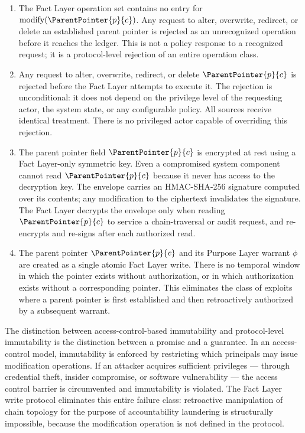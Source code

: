 \begin{enumerate}
    \item[(W1) \textbf{No modification operation defined.}] The Fact Layer operation set contains no entry for $\mathrm{modify}(\ParentPointer{p}{c})$. Any request to alter, overwrite, redirect, or delete an established parent pointer is rejected as an unrecognized operation before it reaches the ledger. This is not a policy response to a recognized request; it is a protocol-level rejection of an entire operation class.

    \item[(W2) \textbf{Unconditional rejection.}] Any request to alter, overwrite, redirect, or delete $\ParentPointer{p}{c}$ is rejected before the Fact Layer attempts to execute it. The rejection is unconditional: it does not depend on the privilege level of the requesting actor, the system state, or any configurable policy. All sources receive identical treatment. There is no privileged actor capable of overriding this rejection.

    \item[(W3) \textbf{Sealed memory envelope.}] The parent pointer field $\ParentPointer{p}{c}$ is encrypted at rest using a Fact Layer-only symmetric key. Even a compromised system component cannot read $\ParentPointer{p}{c}$ because it never has access to the decryption key. The envelope carries an HMAC-SHA-256 signature computed over its contents; any modification to the ciphertext invalidates the signature. The Fact Layer decrypts the envelope only when reading $\ParentPointer{p}{c}$ to service a chain-traversal or audit request, and re-encrypts and re-signs after each authorized read.

    \item[(W4) \textbf{Atomic provisioning.}] The parent pointer $\ParentPointer{p}{c}$ and its Purpose Layer warrant $\phi$ are created as a single atomic Fact Layer write. There is no temporal window in which the pointer exists without authorization, or in which authorization exists without a corresponding pointer. This eliminates the class of exploits where a parent pointer is first established and then retroactively authorized by a subsequent warrant.
\end{enumerate}

The distinction between access-control-based immutability and protocol-level immutability is the distinction between a promise and a guarantee. In an access-control model, immutability is enforced by restricting which principals may issue modification operations. If an attacker acquires sufficient privileges --- through credential theft, insider compromise, or software vulnerability --- the access control barrier is circumvented and immutability is violated. The Fact Layer write protocol eliminates this entire failure class: retroactive manipulation of chain topology for the purpose of accountability laundering is structurally impossible, because the modification operation is not defined in the protocol.

